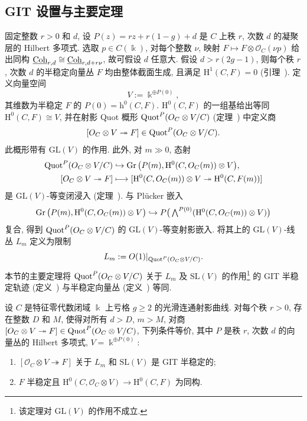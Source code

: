 \subsection{GIT 设置与主要定理}\label{src:9.5.1-subsection}
固定整数 $r>0$ 和 $d$, 设 $P(z)=rz+r(1-g)+d$ 是 $C$ 上秩 $r$, 次数 $d$ 的凝聚层的 Hilbert 多项式. 选取 $p\in C(\Bbbk)$, 对每个整数 $\nu$, 映射 $F\mapsto F\otimes\mathcal O_C(\nu p)$ 给出同构 $\underline{\mathrm{Coh}}_{r,d}\cong\underline{\mathrm{Coh}}_{r,d+r\nu}$, 故可假设 $d$ 任意大. 假设 $d>r(2g-1)$, 则每个秩 $r$, 次数 $d$ 的半稳定向量丛 $F$ 均由整体截面生成, 且满足 $\mathrm H^1(C,F)=0$ (引理~). 定义向量空间
\[
V:=\Bbbk^{\oplus P(0)},
\]
其维数为半稳定 $F$ 的 $P(0)=\mathrm h^0(C,F)$. $\mathrm H^0(C,F)$ 的一组基给出等同 $\mathrm H^0(C,F)\cong V$, 并在射影 Quot 概形 $\operatorname{Quot}^P(O_C\otimes V/C)$ (定理~) 中定义商
\[
[O_C\otimes V\twoheadrightarrow F]\in\operatorname{Quot}^P(O_C\otimes V/C).
\]
此概形带有 $\mathrm{GL}(V)$ 的作用. 此外, 对 $m\gg0$, 态射
\[
\begin{aligned}
\Quot^P(\mathcal O_C\otimes V/C)&\hookrightarrow\Gr\big(P(m),\mathrm H^0(C,\mathcal O_C(m))\otimes V\big),\\
[\mathcal O_C\otimes V\twoheadrightarrow F]&\longmapsto[\mathrm H^0(C,\mathcal O_C(m))\otimes V\twoheadrightarrow\mathrm H^0(C,F(m))]
\end{aligned}
\]
是 $\mathrm{GL}(V)$-等变闭浸入 (定理~). 与 Pl\"ucker 嵌入
\[
\operatorname{Gr}\big(P(m),\mathrm H^0(C,O_C(m))\otimes V\big)\hookrightarrow P\big(\textstyle\bigwedge^{P(0)}(\mathrm H^0(C,O_C(m))\otimes V)\big)
\]
复合, 得到 $\operatorname{Quot}^P(O_C\otimes V/C)$ 的 $\mathrm{GL}(V)$-等变射影嵌入. 将其上的 $\mathrm{GL}(V)$-线丛 $L_m$ 定义为限制
\[
L_m:=O(1)|_{\operatorname{Quot}^P(O_C\otimes V/C)}.
\]
本节的主要定理将 $\operatorname{Quot}^P(O_C\otimes V/C)$ 关于 $L_m$ 及 $\mathrm{SL}(V)$ 的作用\footnote{该定理对 $\mathrm{GL}(V)$ 的作用不成立.} 的 GIT 半稳定轨迹 (定义~) 与半稳定向量丛 (定义~) 等同.
\begin{theorem}\label{src:9.5.1}
设 $C$ 是特征零代数闭域 $\Bbbk$ 上亏格 $g\geq2$ 的光滑连通射影曲线. 对每个秩 $r>0$, 存在整数 $D$ 和 $M$, 使得对所有 $d>D$, $m>M$, 对商 $[O_C\otimes V\twoheadrightarrow F]\in\operatorname{Quot}^P(O_C\otimes V/C)$, 下列条件等价, 其中 $P$ 是秩 $r$, 次数 $d$ 的向量丛的 Hilbert 多项式, $V=\Bbbk^{\oplus P(0)}$:
\begin{enumerate}[(1)]
\item $[\mathcal O_C\otimes V\twoheadrightarrow F]$ 关于 $L_m$ 和 $\mathrm{SL}(V)$ 是 GIT 半稳定的;
\item $F$ 半稳定且 $\mathrm H^0(C,\mathcal O_C\otimes V)\to\mathrm H^0(C,F)$ 为同构.
\end{enumerate}
\end{theorem}
